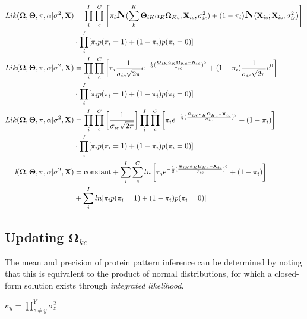 \begin{align}
Lik(\mathbf{\Omega}, \mathbf{\Theta}, \pi, \alpha | \sigma^{2}, \textbf{X}) &= \prod_{i}^{I}\prod_{c}^{C}\left[ \pi_{i}\mbox{\Large \textbf{N}}(\sum_{k}^{K}\mathbf{\Theta}_{iK}\alpha_{K}\mathbf{\Omega}_{Kc} ; \textbf{X}_{ic}, \sigma^{2}_{ic}) + (1-\pi_{i})\mbox{\Large \textbf{N}}( \textbf{X}_{ic}; \textbf{X}_{ic}, \sigma^{2}_{ic}) \right] \notag\\
&\cdot \prod_{i}^{I}[\pi_{i}p(\pi_{i} = 1) + (1-\pi_{i})p(\pi_{i} = 0)]\notag\\
Lik(\mathbf{\Omega}, \mathbf{\Theta}, \pi, \alpha | \sigma^{2}, \textbf{X}) &= \prod_{i}^{I}\prod_{c}^{C}\left[\pi_{i}\frac{1}{\sigma_{ic}\sqrt{2\pi}}e^{-\frac{1}{2}(\frac{\mathbf{\Theta}_{iK}\alpha_{K}\mathbf{\Omega}_{Kc} - \textbf{X}_{ic}}{\sigma_{ic}})^2} + (1-\pi_{i})\frac{1}{\sigma_{ic}\sqrt{2\pi}}e^{0}\right]\notag\\
&\cdot \prod_{i}^{I}[\pi_{i}p(\pi_{i} = 1) + (1-\pi_{i})p(\pi_{i} = 0)]\notag\\
Lik(\mathbf{\Omega}, \mathbf{\Theta}, \pi, \alpha | \sigma^{2}, \textbf{X}) &= \prod_{i}^{I}\prod_{c}^{C}\left[\frac{1}{\sigma_{ic}\sqrt{2\pi}} \right] \prod_{i}^{I}\prod_{c}^{C}\left[\pi_{i}e^{-\frac{1}{2}(\frac{\mathbf{\Theta}_{iK}\alpha_{K}\mathbf{\Omega}_{Kc} - \textbf{X}_{ic}}{\sigma_{ic}})^2} + (1-\pi_{i})\right]\notag\\
&\cdot \prod_{i}^{I}[\pi_{i}p(\pi_{i} = 1) + (1-\pi_{i})p(\pi_{i} = 0)]\notag\\
\textit{l}(\mathbf{\Omega}, \mathbf{\Theta}, \pi, \alpha | \sigma^{2}, \textbf{X}) &= \text{constant} + \sum_{i}^{I}\sum_{c}^{C}ln\left[\pi_{i}e^{-\frac{1}{2}(\frac{\mathbf{\Theta}_{iK}\alpha_{K}\mathbf{\Omega}_{Kc} - \textbf{X}_{ic}}{\sigma_{ic}})^2} + (1-\pi_{i})\right]\notag\\
&+ \sum_{i}^{I}ln[\pi_{i}p(\pi_{i} = 1) + (1-\pi_{i})p(\pi_{i} = 0)]\label{EM:logLik}
\end{align}

\subsection*{Updating $\mathbf{\Omega}_{kc}$}

The mean and precision of protein pattern inference can be determined by noting that this is equivalent to the product of normal distributions, for which a closed-form solution exists through \textit{integrated likelihood}.

$\kappa_{y} = \prod_{z \neq y}^{Y}\sigma^{2}_{z}$

